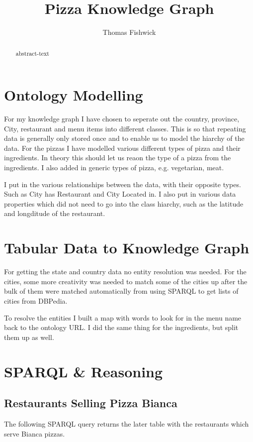 \documentclass[11pt]{report} %
\title{Pizza Knowledge Graph}
\author{Thomas Fishwick}
\begin{document}
\begin{minipage}{\textwidth}
	\maketitle

	\begin{abstract}
		abstract-text
	\end{abstract}
\end{minipage}

\tableofcontents

\chapter{Ontology Modelling}

For my knowledge graph I have chosen to seperate out the country, province, City, restaurant and menu items into different classes.
This is so that repeating data is generally only stored once and to enable us to model the hiarchy of the data.
For the pizzas I have modelled various different types of pizza and their ingredients.
In theory this should let us reaon the type of a pizza from the ingredients. I also added in generic types of pizza, e.g. vegetarian, meat.

I put in the various relationships between the data, with their opposite types. Such as City has Restaurant and City Located in.
I also put in various data properties which did not need to go into the class hiarchy, such as the latitude and longditude of the restaurant.

\chapter{Tabular Data to Knowledge Graph}

For getting the state and country data no entity resolution was needed.
For the cities, some more creativity was needed to match some of the cities up after the bulk of them were matched automatically from using SPARQL to get lists of cities from DBPedia.

To resolve the entities I built a map with words to look for in the menu name back to the ontology URL. I did the same thing for the ingredients, but split them up as well.

\chapter{SPARQL \& Reasoning}
\section{Restaurants Selling Pizza Bianca}
The following SPARQL query returns the later table with the restaurants which serve Bianca pizzas.
\end{document}

